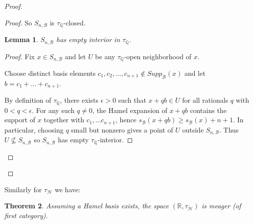 \documentclass[11pt]{amsart} %
\newtheorem{theorem}{Theorem}[section]
\newtheorem{lemma}[theorem]{Lemma}
\theoremstyle{definition}
\newcommand{\B}{\mathcal{B}}
\newcommand{\Q}{\mathbb{Q}}
\newcommand{\AD}{\mathcal{H}}
\begin{document}
\begin{proof}
\begin{proof}
So $S_{n,\B}$ is $\tau_{\Q}$-closed.

\begin{lemma} $S_{n,\B}$ has empty interior in $\tau_{\Q}$. 
\end{lemma} 
\begin{proof} Fix $x\in S_{n,\B}$ and let $U$ be any $\tau_{\Q}$-open neighborhood of $x$. 

Choose distinct basis elements $c_1,c_2, \ldots, c_{n+1}\not\in Supp_\B(x)$ and let $b=c_1+\ldots + c_{n+1}$. 

By definition of $\tau_{\Q}$, there exists $\epsilon>0$ such that $x+qb\in U$ for all rationals $q$ with $0<q<\epsilon$. For any such $q\ne0$, the Hamel expansion of $x+qb$ contains the support of $x$ together with $c_{1},\ldots c_{n+1}$, hence $s_\B(x+qb)\ge s_\B(x)+n+1$. In particular, choosing $q$ small but nonzero gives a point of $U$ outside $S_{n,\B}$. Thus $U\not\subseteq S_{n,\B}$ so $S_{n,\B}$ has empty $\tau_{\Q}$-interior.
\end{proof} 
\end{proof}
\renewcommand{\qedsymbol}{}
\end{proof}

Similarly for $\tau_{\AD}$ we have: 

\begin{theorem}
\label{thm:7.3}
Assuming a Hamel basis exists, the space $(\mathbb{R}, \tau_{\AD})$ is meager (of first category).
\end{theorem}
\end{document}
